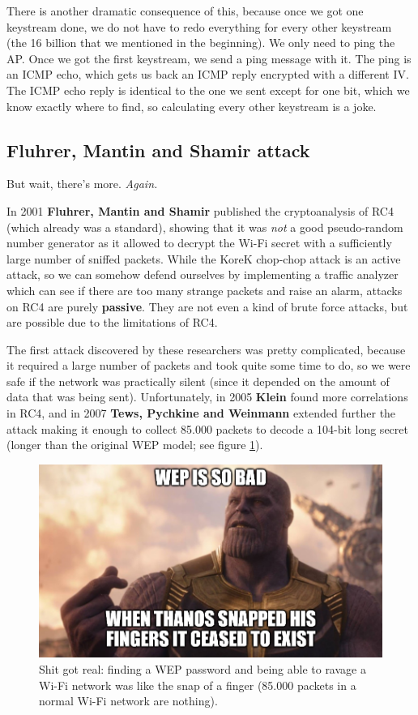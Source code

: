 There is another dramatic consequence of this, because once we got one keystream done, we do not have to redo everything for every other keystream (the 16 billion that we mentioned in the beginning). We only need to ping the AP. Once we got the first keystream, we send a ping message with it. The ping is an ICMP echo, which gets us back an ICMP reply encrypted with a different IV. The ICMP echo reply is identical to the one we sent except for one bit, which we know exactly where to find, so calculating every other keystream is a joke.


\subsection{Fluhrer, Mantin and Shamir attack}
But wait, there's more. \textit{Again.}

In 2001 \textbf{Fluhrer, Mantin and Shamir} published the cryptoanalysis of RC4 (which already was a standard), showing that it was \textit{not} a good pseudo-random number generator as it allowed to decrypt the Wi-Fi secret with a sufficiently large number of sniffed packets. While the KoreK chop-chop attack is an active attack, so we can somehow defend ourselves by implementing a traffic analyzer which can see if there are too many strange packets and raise an alarm, attacks on RC4 are purely \textbf{passive}. They are not even a kind of brute force attacks, but are possible due to the limitations of RC4.

The first attack discovered by these researchers was pretty complicated, because it required a large number of packets and took quite some time to do, so we were safe if the network was practically silent (since it depended on the amount of data that was being sent). Unfortunately, in 2005 \textbf{Klein} found more correlations in RC4, and in 2007 \textbf{Tews, Pychkine and Weinmann} extended further the attack making it enough to collect 85.000 packets to decode a 104-bit long secret (longer than the original WEP model; see figure \ref{fig:meme_thanos_wep}).

\begin{figure}[h]
    \centering
    \includegraphics[scale=0.5]{img/meme_thanos_wep.png}
    \decoRule
    \caption{Shit got real: finding a WEP password and being able to ravage a Wi-Fi network was like the snap of a finger (85.000 packets in a normal Wi-Fi network are nothing).}
    \label{fig:meme_thanos_wep}
\end{figure}
 
